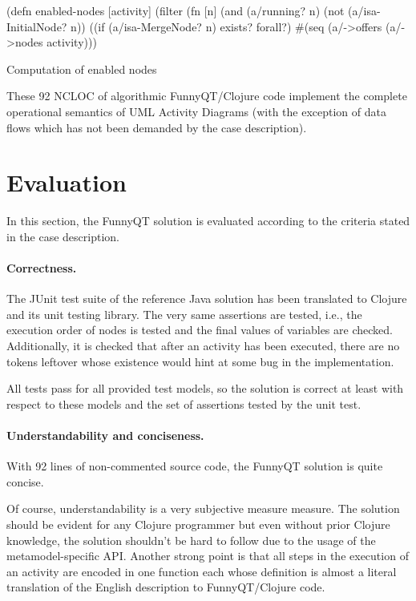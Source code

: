 \documentclass[submission]{eptcs}
\begin{document}
\begin{listing}[h!tb]
\begin{clojurecode}
(defn enabled-nodes [activity]
  (filter (fn [n]
            (and (a/running? n)
                 (not (a/isa-InitialNode? n))
                 ((if (a/isa-MergeNode? n) exists? forall?)
                  #(seq (a/->offers %
          (a/->nodes activity)))
\end{clojurecode}
\caption{Computation of enabled nodes}
\label{lst:enabled-nodes}
\end{listing}

These 92 NCLOC of algorithmic FunnyQT/Clojure code implement the complete
operational semantics of UML Activity Diagrams (with the exception of data
flows which has not been demanded by the case description).

\section{Evaluation}
\label{sec:evaluation}

In this section, the FunnyQT solution is evaluated according to the criteria
stated in the case description.

\paragraph{Correctness.}

The JUnit test suite of the reference Java solution has been translated to
Clojure and its unit testing library.  The very same assertions are tested,
i.e., the execution order of nodes is tested and the final values of variables
are checked.  Additionally, it is checked that after an activity has been
executed, there are no tokens leftover whose existence would hint at some bug
in the implementation.

All tests pass for all provided test models, so the solution is correct at
least with respect to these models and the set of assertions tested by the unit
test.


\paragraph{Understandability and conciseness.}

With 92 lines of non-commented source code, the FunnyQT solution is quite
concise.

Of course, understandability is a very subjective measure measure.  The
solution should be evident for any Clojure programmer but even without prior
Clojure knowledge, the solution shouldn't be hard to follow due to the usage of
the metamodel-specific API.  Another strong point is that all steps in the
execution of an activity are encoded in one function each whose definition is
almost a literal translation of the English description to FunnyQT/Clojure
code.
\end{document}
